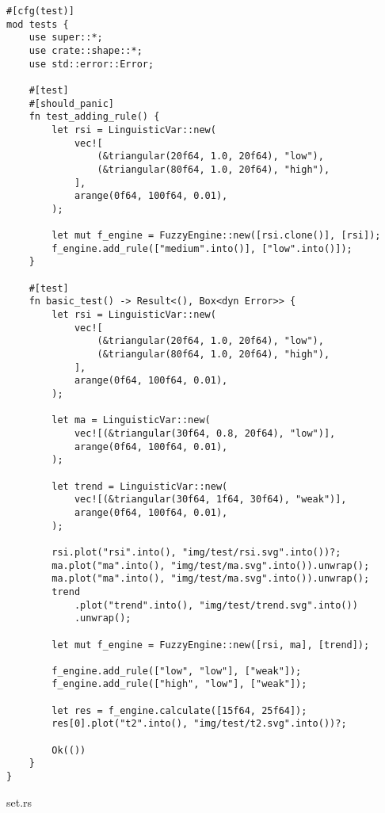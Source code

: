 \begin{verbatim}
#[cfg(test)]
mod tests {
    use super::*;
    use crate::shape::*;
    use std::error::Error;

    #[test]
    #[should_panic]
    fn test_adding_rule() {
        let rsi = LinguisticVar::new(
            vec![
                (&triangular(20f64, 1.0, 20f64), "low"),
                (&triangular(80f64, 1.0, 20f64), "high"),
            ],
            arange(0f64, 100f64, 0.01),
        );

        let mut f_engine = FuzzyEngine::new([rsi.clone()], [rsi]);
        f_engine.add_rule(["medium".into()], ["low".into()]);
    }

    #[test]
    fn basic_test() -> Result<(), Box<dyn Error>> {
        let rsi = LinguisticVar::new(
            vec![
                (&triangular(20f64, 1.0, 20f64), "low"),
                (&triangular(80f64, 1.0, 20f64), "high"),
            ],
            arange(0f64, 100f64, 0.01),
        );

        let ma = LinguisticVar::new(
            vec![(&triangular(30f64, 0.8, 20f64), "low")],
            arange(0f64, 100f64, 0.01),
        );

        let trend = LinguisticVar::new(
            vec![(&triangular(30f64, 1f64, 30f64), "weak")],
            arange(0f64, 100f64, 0.01),
        );

        rsi.plot("rsi".into(), "img/test/rsi.svg".into())?;
        ma.plot("ma".into(), "img/test/ma.svg".into()).unwrap();
        ma.plot("ma".into(), "img/test/ma.svg".into()).unwrap();
        trend
            .plot("trend".into(), "img/test/trend.svg".into())
            .unwrap();

        let mut f_engine = FuzzyEngine::new([rsi, ma], [trend]);

        f_engine.add_rule(["low", "low"], ["weak"]);
        f_engine.add_rule(["high", "low"], ["weak"]);

        let res = f_engine.calculate([15f64, 25f64]);
        res[0].plot("t2".into(), "img/test/t2.svg".into())?;

        Ok(())
    }
}
\end{verbatim}
\noindent set.rs
